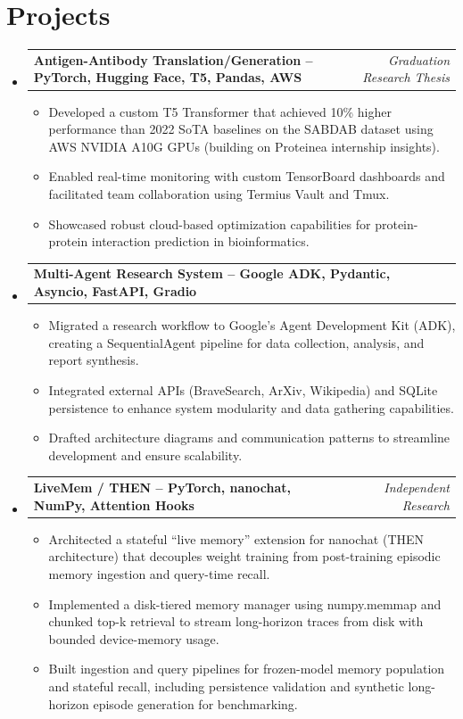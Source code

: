 \documentclass[10pt, letterpaper]{extarticle}
\makeatletter
\newcommand{\resumeItem}[1]{\item{#1}}
\newcommand{\resumeProjectHeading}[2]{
    \item
    \begin{tabular*}{\textwidth}[t]{@{}p{0.82\textwidth}@{\extracolsep{\fill}}r@{}}
       \textbf{#1} & \textit{#2} \\
    \end{tabular*}\vspace{2pt}
}
\makeatother
\begin{document}
\section{Projects}

\begin{itemize}[label={}, leftmargin=0in]

 \resumeProjectHeading{Antigen-Antibody Translation/Generation -- PyTorch, Hugging Face, T5, Pandas, AWS}{Graduation Research Thesis}
 \begin{itemize}[label={--}]
    \resumeItem{Developed a custom T5 Transformer that achieved 10\% higher performance than 2022 SoTA baselines on the SABDAB dataset using AWS NVIDIA A10G GPUs (building on Proteinea internship insights).}
    \resumeItem{Enabled real-time monitoring with custom TensorBoard dashboards and facilitated team collaboration using Termius Vault and Tmux.}
    \resumeItem{Showcased robust cloud-based optimization capabilities for protein-protein interaction prediction in bioinformatics.}
 \end{itemize}

 \resumeProjectHeading{Multi-Agent Research System -- Google ADK, Pydantic, Asyncio, FastAPI, Gradio}{}
 \begin{itemize}[label={--}]
    \resumeItem{Migrated a research workflow to Google’s Agent Development Kit (ADK), creating a SequentialAgent pipeline for data collection, analysis, and report synthesis.}
    \resumeItem{Integrated external APIs (BraveSearch, ArXiv, Wikipedia) and SQLite persistence to enhance system modularity and data gathering capabilities.}
    \resumeItem{Drafted architecture diagrams and communication patterns to streamline development and ensure scalability.}
 \end{itemize}

\newpage
 \resumeProjectHeading{LiveMem / THEN -- PyTorch, nanochat, NumPy, Attention Hooks}{Independent Research}
 \begin{itemize}[label={--}]
    \resumeItem{Architected a stateful “live memory” extension for nanochat (THEN architecture) that decouples weight training from post-training episodic memory ingestion and query-time recall.}
    \resumeItem{Implemented a disk-tiered memory manager using numpy.memmap and chunked top-k retrieval to stream long-horizon traces from disk with bounded device-memory usage.}
    \resumeItem{Built ingestion and query pipelines for frozen-model memory population and stateful recall, including persistence validation and synthetic long-horizon episode generation for benchmarking.}
 \end{itemize}


\end{itemize}
\end{document}
